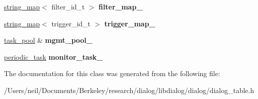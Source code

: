 \begin{DoxyCompactItemize}
\hyperlink{classdialog_1_1string__map}{string\+\_\+map}$<$ filter\+\_\+id\+\_\+t $>$ {\bfseries filter\+\_\+map\+\_\+}
\item 
\mbox{\label{classdialog_1_1dialog__table_a648401e68f3ccc3c945e42bf28ed8835}} 
\hyperlink{classdialog_1_1string__map}{string\+\_\+map}$<$ trigger\+\_\+id\+\_\+t $>$ {\bfseries trigger\+\_\+map\+\_\+}
\item 
\mbox{\label{classdialog_1_1dialog__table_a3d91f89cdf0efebe15f2f15109cdf6fe}} 
\hyperlink{classtask__pool}{task\+\_\+pool} \& {\bfseries mgmt\+\_\+pool\+\_\+}
\item 
\mbox{\label{classdialog_1_1dialog__table_a644c471ccdeca21088806bb000b645d3}} 
\hyperlink{classperiodic__task}{periodic\+\_\+task} {\bfseries monitor\+\_\+task\+\_\+}
\end{DoxyCompactItemize}


The documentation for this class was generated from the following file\+:\begin{DoxyCompactItemize}
\item 
/\+Users/neil/\+Documents/\+Berkeley/research/dialog/libdialog/dialog/dialog\+\_\+table.\+h\end{DoxyCompactItemize}
